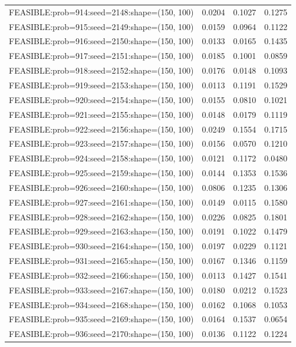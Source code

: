 \begin{longtable}{lccc}
FEASIBLE:prob=914:seed=2148:shape=(150, 100) & 0.0204 & 0.1027 & 0.1275 \\
FEASIBLE:prob=915:seed=2149:shape=(150, 100) & 0.0159 & 0.0964 & 0.1122 \\
FEASIBLE:prob=916:seed=2150:shape=(150, 100) & 0.0133 & 0.0165 & 0.1435 \\
FEASIBLE:prob=917:seed=2151:shape=(150, 100) & 0.0185 & 0.1001 & 0.0859 \\
FEASIBLE:prob=918:seed=2152:shape=(150, 100) & 0.0176 & 0.0148 & 0.1093 \\
FEASIBLE:prob=919:seed=2153:shape=(150, 100) & 0.0113 & 0.1191 & 0.1529 \\
FEASIBLE:prob=920:seed=2154:shape=(150, 100) & 0.0155 & 0.0810 & 0.1021 \\
FEASIBLE:prob=921:seed=2155:shape=(150, 100) & 0.0148 & 0.0179 & 0.1119 \\
FEASIBLE:prob=922:seed=2156:shape=(150, 100) & 0.0249 & 0.1554 & 0.1715 \\
FEASIBLE:prob=923:seed=2157:shape=(150, 100) & 0.0156 & 0.0570 & 0.1210 \\
FEASIBLE:prob=924:seed=2158:shape=(150, 100) & 0.0121 & 0.1172 & 0.0480 \\
FEASIBLE:prob=925:seed=2159:shape=(150, 100) & 0.0144 & 0.1353 & 0.1536 \\
FEASIBLE:prob=926:seed=2160:shape=(150, 100) & 0.0806 & 0.1235 & 0.1306 \\
FEASIBLE:prob=927:seed=2161:shape=(150, 100) & 0.0149 & 0.0115 & 0.1580 \\
FEASIBLE:prob=928:seed=2162:shape=(150, 100) & 0.0226 & 0.0825 & 0.1801 \\
FEASIBLE:prob=929:seed=2163:shape=(150, 100) & 0.0191 & 0.1022 & 0.1479 \\
FEASIBLE:prob=930:seed=2164:shape=(150, 100) & 0.0197 & 0.0229 & 0.1121 \\
FEASIBLE:prob=931:seed=2165:shape=(150, 100) & 0.0167 & 0.1346 & 0.1159 \\
FEASIBLE:prob=932:seed=2166:shape=(150, 100) & 0.0113 & 0.1427 & 0.1541 \\
FEASIBLE:prob=933:seed=2167:shape=(150, 100) & 0.0180 & 0.0212 & 0.1523 \\
FEASIBLE:prob=934:seed=2168:shape=(150, 100) & 0.0162 & 0.1068 & 0.1053 \\
FEASIBLE:prob=935:seed=2169:shape=(150, 100) & 0.0164 & 0.1537 & 0.0654 \\
FEASIBLE:prob=936:seed=2170:shape=(150, 100) & 0.0136 & 0.1122 & 0.1224 \\

\end{longtable}
